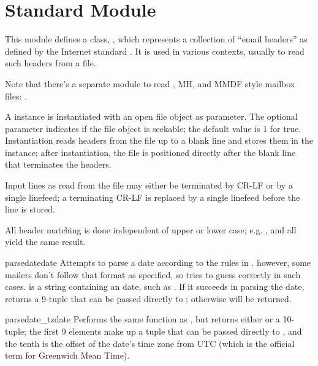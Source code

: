 \section{Standard Module }
\label{module-rfc822}

\renewcommand{\indexsubitem}{(in module rfc822)}

This module defines a class, , which represents a
collection of ``email headers'' as defined by the Internet standard
.  It is used in various contexts, usually to read such
headers from a file.

Note that there's a separate module to read \UNIX{}, MH, and MMDF
style mailbox files: .

A  instance is instantiated with an open file object as
parameter.  The optional  parameter indicates if the
file object is seekable; the default value is 1 for true.
Instantiation reads headers from the file up to a blank line and
stores them in the instance; after instantiation, the file is
positioned directly after the blank line that terminates the headers.

Input lines as read from the file may either be terminated by CR-LF or
by a single linefeed; a terminating CR-LF is replaced by a single
linefeed before the line is stored.

All header matching is done independent of upper or lower case;
e.g. ,  and  all yield
the same result.

\begin{funcdesc}{parsedate}{date}
Attempts to parse a date according to the rules in .  however,
some mailers don't follow that format as specified, so
 tries to guess correctly in such cases. 
 is a string containing an  date, such as 
.  If it succeeds in parsing
the date,  returns a 9-tuple that can be passed
directly to ; otherwise  will be
returned.  
\end{funcdesc}

\begin{funcdesc}{parsedate_tz}{date}
Performs the same function as , but returns either
 or a 10-tuple; the first 9 elements make up a tuple that
can be passed directly to , and the tenth is the
offset of the date's time zone from UTC (which is the official term
for Greenwich Mean Time).
\end{funcdesc}

